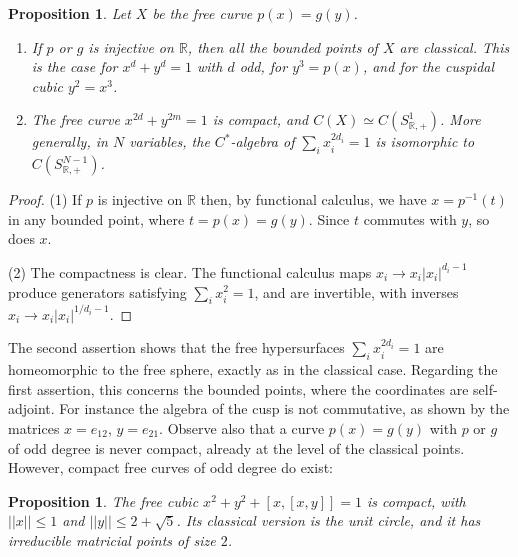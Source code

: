 \documentclass[11pt]{amsart}
\newtheorem{proposition}[theorem]{Proposition}
\theoremstyle{definition}
\begin{document}
\begin{proposition}\label{p62}
Let $X$ be the free curve $p(x)=g(y)$.
\begin{enumerate}
\item If $p$ or $g$ is injective on $\mathbb R$, then all the bounded points of $X$ are classical. This is the case for $x^d+y^d=1$ with $d$ odd, for $y^3=p(x)$, and for the cuspidal cubic $y^2=x^3$.

\item The free curve $x^{2d}+y^{2m}=1$ is compact, and $C(X)\simeq C(S^1_{\mathbb R,+})$. More generally, in $N$ variables, the $C^*$-algebra of $\sum_ix_i^{2d_i}=1$ is isomorphic to $C(S^{N-1}_{\mathbb R,+})$.
\end{enumerate}
\end{proposition}

\begin{proof}
(1) If $p$ is injective on $\mathbb R$ then, by functional calculus, we have $x=p^{-1}(t)$ in any bounded point, where $t=p(x)=g(y)$. Since $t$ commutes with $y$, so does $x$.

(2) The compactness is clear. The functional calculus maps $x_i\to x_i|x_i|^{d_i-1}$ produce generators satisfying $\sum_ix_i^2=1$, and are invertible, with inverses $x_i\to x_i|x_i|^{1/d_i-1}$.
\end{proof}

The second assertion shows that the free hypersurfaces $\sum_ix_i^{2d_i}=1$ are homeomorphic to the free sphere, exactly as in the classical case. Regarding the first assertion, this concerns the bounded points, where the coordinates are self-adjoint. For instance the algebra of the cusp is not commutative, as shown by the matrices $x=e_{12}$, $y=e_{21}$. Observe also that a curve $p(x)=g(y)$ with $p$ or $g$ of odd degree is never compact, already at the level of the classical points. However, compact free curves of odd degree do exist:

\begin{proposition}\label{p63}
The free cubic $x^2+y^2+[x,[x,y]]=1$ is compact, with $||x||\leq1$ and $||y||\leq2+\sqrt5$. Its classical version is the unit circle, and it has irreducible matricial points of size $2$.
\end{proposition}
\end{document}
